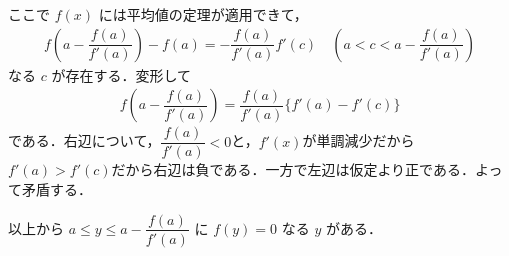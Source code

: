 \documentclass[../../main.tex]{subfiles}
\begin{document}
ここで $f(x)$ には平均値の定理が適用できて，
\begin{align}
  f\left(a - \dfrac{f(a)}{f'(a)}\right) - f(a) = -\dfrac{f(a)}{f'(a)} f'(c) \quad
  \left(a < c < a - \dfrac{f(a)}{f'(a)}\right)
\end{align}
なる $c$ が存在する．変形して
\begin{align}
  f\left(a - \dfrac{f(a)}{f'(a)}\right) = \dfrac{f(a)}{f'(a)} \{ f'(a) - f'(c) \} \label{eq:7}
\end{align}
である．右辺について，$\dfrac{f(a)}{f'(a)}<0$と，$f'(x)$が単調減少だから$f'(a)>f'(c)$だから右辺は負である．一方で左辺は仮定より正である．よって矛盾する．

以上から $a \le y \le a - \dfrac{f(a)}{f'(a)}$ に $f(y) = 0$ なる $y$ がある．
\end{document}
